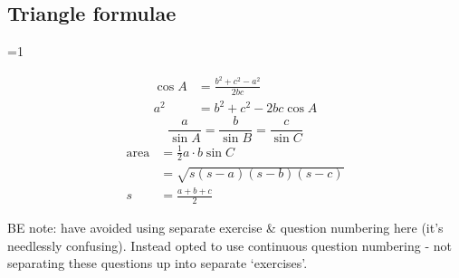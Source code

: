 \subsection{Triangle formulae} 
\label{subsec:triangle_formulae}

\ifnum \value{printWorkedSols}=1 

\begin{align}
	\cos{A} 
		&= \frac{b^{2} + c^{2} - a^{2}}{2bc} 
		\\
	a^{2}
		&= b^{2} + c^{2} - 2bc \cos{A}
\end{align}
\begin{equation}
	\frac{a}{\sin{A}} 
	= 
	\frac{b}{\sin{B}} 
	=
	\frac{c}{\sin{C}} 
\end{equation}
\begin{align}
	\text{area}
		&= \frac{1}{2}a \cdot b \sin{C}
		\\
		&= \sqrt{s(s-a)(s-b)(s-c)}
		\\
	s
		&= \frac{a+b+c}{2}
\end{align}

\fi

BE note: have avoided using separate exercise \& question numbering here 
(it's needlessly confusing). 
Instead opted to use continuous question numbering 
- not separating these questions up into separate `exercises'.


